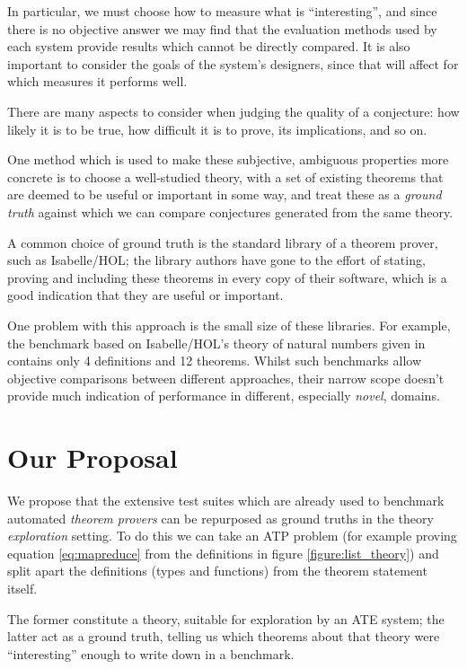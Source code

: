 In particular, we must choose how to measure what is ``interesting'', and since
there is no objective answer we may find that the evaluation methods used by
each system provide results which cannot be directly compared. It is also
important to consider the goals of the system's designers, since that will
affect for which measures it performs well.

There are many aspects to consider when judging the quality of a conjecture: how
likely it is to be true, how difficult it is to prove, its implications, and so
on.

One method which is used to make these subjective, ambiguous properties more
concrete is to choose a well-studied theory, with a set of existing theorems that
are deemed to be useful or important in some way, and treat these as a
\emph{ground truth} against which we can compare conjectures generated from the
same theory.

A common choice of ground truth is the standard library of a theorem prover,
such as Isabelle/HOL; the library authors have gone to the effort of stating,
proving and including these theorems in every copy of their software, which is a
good indication that they are useful or important.

One problem with this approach is the small size of these libraries. For
example, the benchmark based on Isabelle/HOL's theory of natural numbers given
in~\cite{Johansson.Dixon.Bundy:conjecture-generation} contains
only 4 definitions and 12 theorems. Whilst such benchmarks allow objective
comparisons between different approaches, their narrow scope doesn't provide
much indication of performance in different, especially \emph{novel}, domains.

\section{Our Proposal}
\label{sec:proposal}

We propose that the extensive test suites which are already used to benchmark
automated \emph{theorem provers} can be repurposed as ground truths in the
theory \emph{exploration} setting. To do this we can take an ATP problem (for
example proving equation \ref{eq:mapreduce} from the definitions in figure
\ref{figure:list_theory}) and split apart the definitions (types and functions)
from the theorem statement itself.

The former constitute a theory, suitable for exploration by an ATE system; the
latter act as a ground truth, telling us which theorems about that theory were
``interesting'' enough to write down in a benchmark.

